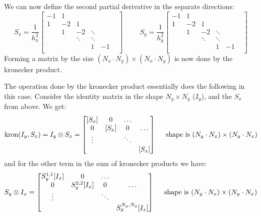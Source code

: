 \documentclass[10pt]{report}
\begin{document}
We can now define the second partial derivative in the separate directions:
\begin{equation}
    S_x = \frac{1}{h_x^2}\begin{bmatrix}
        -1&1&\\
        1&-2&1&\\
        &1&-2&\ddots\\
        &&\ddots&\ddots&&
        \\
        &&&1&-1\\
    \end{bmatrix}\hspace{1cm}S_y = \frac{1}{h_y^2}\begin{bmatrix}
        -1&1&\\
        1&-2&1&\\
        &1&-2&\ddots\\
        &&\ddots&\ddots&&
        \\
        &&&1&-1\\
    \end{bmatrix} \label{lall}
\end{equation}
Forming a matrix by the size $(N_x \cdot N_y) \times (N_x \cdot N_y)$ is now done by the kronecker product.

The operation done by the kronecker product essentially does the following in this case. Consider the identity matrix in the shape $N_y\times N_y$ ($I_y$), and the $S_x$ from above. We get:
\begin{equation*}
    \text{kron}(I_y, S_x) =  I_y \otimes S_x = \begin{bmatrix}
        [S_x] & 0 & \hdots\\
        0&[S_x]&0 &\hdots\\
        \vdots& &\ddots\\
        &&&[S_x]
    \end{bmatrix} \hspace{5 mm} \text{shape is $(N_y\cdot N_x) \times (N_y\cdot N_x)$} 
\end{equation*} 
and for the other term in the sum of kronecker products we have:
\begin{equation*}
    S_y \otimes I_x = \begin{bmatrix}
        S_y^{1,1} [I_x] & 0 & \hdots\\
        0&S_y^{2,2}[I_x]& 0 &\hdots\\
        \vdots& &\ddots\\
        &&&S_y^{N_y,N_y}[I_x]
        \end{bmatrix}\hspace{5 mm} \text{shape is $(N_y\cdot N_x) \times (N_y\cdot N_x)$} 
\end{equation*}
\end{document}
